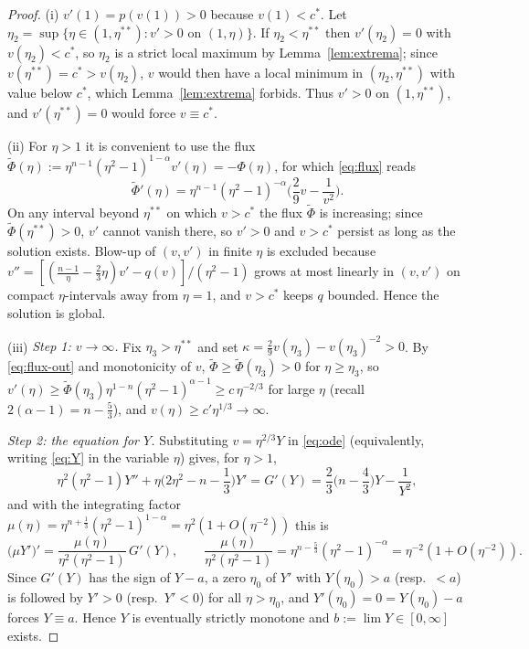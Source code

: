 \documentclass[11pt,a4paper]{amsart}
\theoremstyle{definition}
\theoremstyle{remark}
\newcommand{\cstar}{c^{*}}
\begin{document}
\begin{proof}
(i) $v'(1)=p(v(1))>0$ because $v(1)<\cstar$.  Let $\eta_2=\sup\{\eta\in(1,\eta^{**}):v'>0\text{ on }(1,\eta)\}$.  If $\eta_2<\eta^{**}$ then $v'(\eta_2)=0$ with $v(\eta_2)<\cstar$, so $\eta_2$ is a strict local maximum by Lemma~\ref{lem:extrema}; since $v(\eta^{**})=\cstar>v(\eta_2)$, $v$ would then have a local minimum in $(\eta_2,\eta^{**})$ with value below $\cstar$, which Lemma~\ref{lem:extrema} forbids.  Thus $v'>0$ on $(1,\eta^{**})$, and $v'(\eta^{**})=0$ would force $v\equiv\cstar$.

(ii) For $\eta>1$ it is convenient to use the flux $\tilde\Phi(\eta):=\eta^{n-1}(\eta^2-1)^{1-\alpha}v'(\eta)=-\Phi(\eta)$, for which \eqref{eq:flux} reads
\begin{equation}\label{eq:flux-out}
\tilde\Phi'(\eta)=\eta^{n-1}(\eta^2-1)^{-\alpha}\Big(\frac29v-\frac1{v^2}\Big).
\end{equation}
On any interval beyond $\eta^{**}$ on which $v>\cstar$ the flux $\tilde\Phi$ is increasing; since $\tilde\Phi(\eta^{**})>0$, $v'$ cannot vanish there, so $v'>0$ and $v>\cstar$ persist as long as the solution exists.  Blow-up of $(v,v')$ in finite $\eta$ is excluded because $v''=[(\frac{n-1}\eta-\frac23\eta)v'-q(v)]/(\eta^2-1)$ grows at most linearly in $(v,v')$ on compact $\eta$-intervals away from $\eta=1$, and $v>\cstar$ keeps $q$ bounded.  Hence the solution is global.

(iii) \emph{Step 1: $v\to\infty$.}  Fix $\eta_3>\eta^{**}$ and set $\kappa=\frac29v(\eta_3)-v(\eta_3)^{-2}>0$.  By \eqref{eq:flux-out} and monotonicity of $v$, $\tilde\Phi\ge\tilde\Phi(\eta_3)>0$ for $\eta\ge\eta_3$, so $v'(\eta)\ge\tilde\Phi(\eta_3)\eta^{1-n}(\eta^2-1)^{\alpha-1}\ge c\,\eta^{-2/3}$ for large $\eta$ (recall $2(\alpha-1)=n-\frac53$), and $v(\eta)\ge c'\eta^{1/3}\to\infty$.

\emph{Step 2: the equation for $Y$.}  Substituting $v=\eta^{2/3}Y$ in \eqref{eq:ode} (equivalently, writing \eqref{eq:Y} in the variable $\eta$) gives, for $\eta>1$,
\begin{equation}\label{eq:Yeta}
\eta^2(\eta^2-1)Y''+\eta\Big(2\eta^2-n-\frac13\Big)Y'=G'(Y)=\frac23\Big(n-\frac43\Big)Y-\frac1{Y^2},
\end{equation}
and with the integrating factor $\mu(\eta)=\eta^{n+\frac13}(\eta^2-1)^{1-\alpha}=\eta^2(1+O(\eta^{-2}))$ this is
\begin{equation}\label{eq:muY}
\big(\mu Y'\big)'=\frac{\mu(\eta)}{\eta^2(\eta^2-1)}\,G'(Y),\qquad \frac{\mu(\eta)}{\eta^2(\eta^2-1)}=\eta^{n-\frac53}(\eta^2-1)^{-\alpha}=\eta^{-2}(1+O(\eta^{-2})) .
\end{equation}
Since $G'(Y)$ has the sign of $Y-a$, a zero $\eta_0$ of $Y'$ with $Y(\eta_0)>a$ (resp.\ $<a$) is followed by $Y'>0$ (resp.\ $Y'<0$) for all $\eta>\eta_0$, and $Y'(\eta_0)=0=Y(\eta_0)-a$ forces $Y\equiv a$.  Hence $Y$ is eventually strictly monotone and $b:=\lim Y\in[0,\infty]$ exists.


\end{proof}
\end{document}

